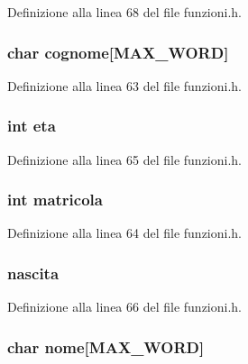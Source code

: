 Definizione alla linea 68 del file funzioni.\+h.

\hypertarget{structstudenti_aec37540b0d415c235eeb1d05240691df}{
\subsubsection[{cognome}]{\setlength{\rightskip}{0pt plus 5cm}char cognome\mbox{[}{\bf M\+A\+X\+\_\+\+W\+O\+R\+D}\mbox{]}}}\label{structstudenti_aec37540b0d415c235eeb1d05240691df}


Definizione alla linea 63 del file funzioni.\+h.

\hypertarget{structstudenti_a1ec09f1a0f2b61e496bd8d0f9416b75e}{
\subsubsection[{eta}]{\setlength{\rightskip}{0pt plus 5cm}int eta}}\label{structstudenti_a1ec09f1a0f2b61e496bd8d0f9416b75e}


Definizione alla linea 65 del file funzioni.\+h.

\hypertarget{structstudenti_af8100806d9eccdb8c237e5b414d59ce9}{
\subsubsection[{matricola}]{\setlength{\rightskip}{0pt plus 5cm}int matricola}}\label{structstudenti_af8100806d9eccdb8c237e5b414d59ce9}


Definizione alla linea 64 del file funzioni.\+h.

\hypertarget{structstudenti_a30ffef5fcbdae0613ebea58e0a34f866}{
\subsubsection[{nascita}]{ nascita}}\label{structstudenti_a30ffef5fcbdae0613ebea58e0a34f866}


Definizione alla linea 66 del file funzioni.\+h.

\hypertarget{structstudenti_aa20591db231b0ea83a7daaf108ed56d6}{
\subsubsection[{nome}]{\setlength{\rightskip}{0pt plus 5cm}char nome\mbox{[}{\bf M\+A\+X\+\_\+\+W\+O\+R\+D}\mbox{]}}}\label{structstudenti_aa20591db231b0ea83a7daaf108ed56d6}


